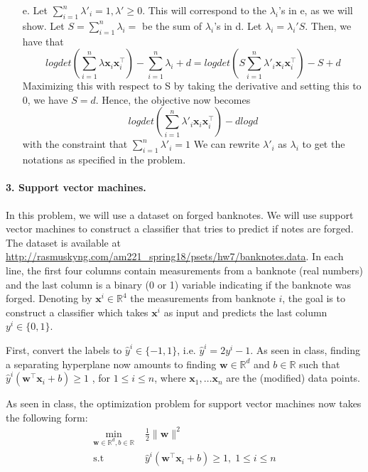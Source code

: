 \documentclass[11pt]{article}
\theoremstyle{remark}
\newcommand{\R}{\mathbb{R}}                     %
\newcommand{\bx}{\mathbf{x}}
\newcommand{\bw}{\mathbf{w}}
\begin{document}
\begin{itemize}
\item[e.]
Let $\sum_{i=1}^n \lambda'_i=1, \lambda' \geq 0$. This will correspond to the $\lambda_i$'s in e, as we will show. Let $S=\sum_{i=1}^n \lambda_i=$ be the sum of $\lambda_i$'s in d. Let $\lambda_i=\lambda_i' S$. Then, we have that
$$logdet(\sum_{i=1}^n\lambda\bx_i\bx_i^\intercal)-\sum_{i=1}^n\lambda_i+d = logdet(S \sum_{i=1}^n \lambda'_i \bx_i\bx_i^\intercal)-S+d$$
Maximizing this with respect to S by taking the derivative and setting this to $0$, we have $S=d$. Hence, the objective now becomes
$$ logdet(\sum_{i=1}^n \lambda'_i \bx_i\bx_i^\intercal)-dlogd$$ with the constraint that $\sum_{i=1}^n \lambda'_i=1$
We can rewrite $\lambda'_i$ as $\lambda_i$ to get the notations as specified in the problem.

\end{itemize}
\color{black}

\paragraph{3. Support vector machines.}

In this problem, we will use a dataset on forged
banknotes. We will use support
vector machines to construct a classifier that tries to predict if
notes are forged.  The dataset is available at
\url{http://rasmuskyng.com/am221_spring18/psets/hw7/banknotes.data}.
In each line, the first four columns contain measurements from a banknote (real numbers) and the last column
is a binary (0 or 1) variable indicating if the banknote was forged. Denoting
by $\bx^i\in\R^4$ the measurements from banknote $i$, the goal is to construct
a classifier which takes $\bx^i$ as input and predicts the last column
$y^i\in\{0, 1\}$.

First, convert the labels to $\hat{y}^i\in\{-1, 1\}$, i.e. $\hat{y}^i
= 2y^i - 1$.
%
As seen in class, finding a separating hyperplane now amounts to
finding $\bw\in\R^d$ and $b \in \R$ such that
$\hat{y}^i (\bw^\intercal\bx_i +b)\geq 1$ , for $1\leq i\leq n$, where $\bx_1,\dots\bx_n$ are
the (modified) data points.

As seen in class, the optimization problem for support vector machines now
takes the following form:
\begin{displaymath}
    \begin{aligned}
        \min_{\bw\in\R^d, b \in \R}&\; \frac{1}{2}\|\bw\|^2\\
        \text{s.t} &\; \hat{y}^i (\bw^\intercal\bx_i +b)\geq 1,\;1\leq i\leq n
    \end{aligned}
\end{displaymath}
\end{document}
